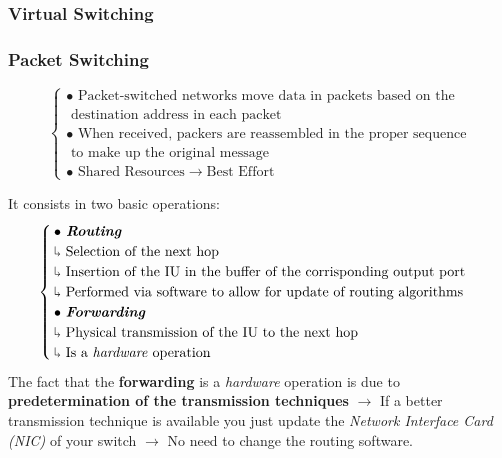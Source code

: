 \subsubsection{Virtual Switching}

\subsubsection{Packet Switching}
\begin{equation}
\begin{cases}
\bullet \text{ Packet-switched networks move data in packets based on the}\\ \text{ destination address in each packet} \\
\bullet \text{ When received, packers are reassembled in the proper sequence} \\ \text{ to make up the original message}\\
\bullet \text{ Shared Resources} \rightarrow \text{Best Effort}
\end{cases}
\end{equation}

It consists in two basic operations:
\begin{equation}
\begin{cases}
\bullet \text{\textit{ \textbf{Routing}}}\\ \rotatebox[origin=c]{180}{$\Lsh$} \text{ Selection of the next hop}\\ \rotatebox[origin=c]{180}{$\Lsh$} \text{ Insertion of the IU in the buffer of the corrisponding output port}\\
\rotatebox[origin=c]{180}{$\Lsh$} \text{ Performed via software to allow for update of routing algorithms}\\
\bullet \text{ \textit{\textbf{Forwarding}}}\\ \rotatebox[origin=c]{180}{$\Lsh$} \text{ Physical transmission of the IU to the next hop}
\\ \rotatebox[origin=c]{180}{$\Lsh$} \text{ Is a \textit{hardware} operation}
\end{cases}
\end{equation}
The fact that the \textbf{forwarding} is a \textit{hardware} operation is due to \textbf{predetermination of the transmission techniques} $\rightarrow$ If a better transmission technique is available you just update the \textit{Network Interface Card (NIC)} of your switch $\rightarrow$ No need to change the routing software.

